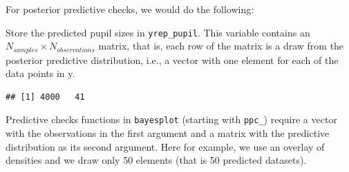 \documentclass[12pt,]{krantz}
\newenvironment{Shaded}{\begin{snugshade}}{\end{snugshade}}
\newcommand{\KeywordTok}[1]{\textcolor[rgb]{0.13,0.29,0.53}{\textbf{#1}}}
\newcommand{\DataTypeTok}[1]{\textcolor[rgb]{0.13,0.29,0.53}{#1}}
\newcommand{\DecValTok}[1]{\textcolor[rgb]{0.00,0.00,0.81}{#1}}
\newcommand{\StringTok}[1]{\textcolor[rgb]{0.31,0.60,0.02}{#1}}
\newcommand{\OperatorTok}[1]{\textcolor[rgb]{0.81,0.36,0.00}{\textbf{#1}}}
\newcommand{\NormalTok}[1]{#1}
\theoremstyle{definition}
\theoremstyle{definition}
\theoremstyle{definition}
\theoremstyle{remark}
\begin{document}
For posterior predictive checks, we would do the following:

\begin{Shaded}
\end{Shaded}

Store the predicted pupil sizes in \texttt{yrep\_pupil}. This variable
contains an \(N_{samples} \times N_{observations}\) matrix, that is,
each row of the matrix is a draw from the posterior predictive
distribution, i.e., a vector with one element for each of the data
points in y.

\begin{Shaded}
\end{Shaded}

\begin{verbatim}
## [1] 4000   41
\end{verbatim}

Predictive checks functions in \texttt{bayesplot} (starting with
\texttt{ppc\_}) require a vector with the observations in the first
argument and a matrix with the predictive distribution as its second
argument. Here for example, we use an overlay of densities and we draw
only 50 elements (that is 50 predicted datasets).

\begin{Shaded}
\end{Shaded}
\end{document}
